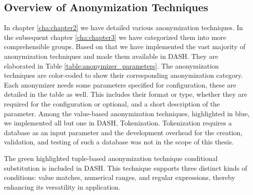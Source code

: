 \subsection{Overview of Anonymization Techniques}
In chapter \ref{cha:chapter2} we have detailed various anonymization techniques. In the subsequent chapter \ref{cha:chapter3} we have categorized them into more comprehensible groups. Based on that we have implemented the vast majority of anonymization techniques and made them available in \ac{DASH}. They are elaborated in Table \ref{table:anonymizer_parameters}. The anonymization techniques are color-coded to show their corresponding anonymization category. Each anonymizer needs some parameters specified for configuration, these are detailed in the table as well. This includes their format or type, whether they are required for the configuration or optional, and a short description of the parameter. Among the value-based anonymization techniques, highlighted in blue, we implemented all but one in \ac{DASH}, Tokenization. Tokenization requires a database as an input parameter and the development overhead for the creation, validation, and testing of such a database was not in the scope of this thesis.\par 
The green highlighted tuple-based anonymization technique conditional substitution is included in \ac{DASH}. This technique supports three distinct kinds of conditions: value matches, numerical ranges, and regular expressions, thereby enhancing its versatility in application.\par 
